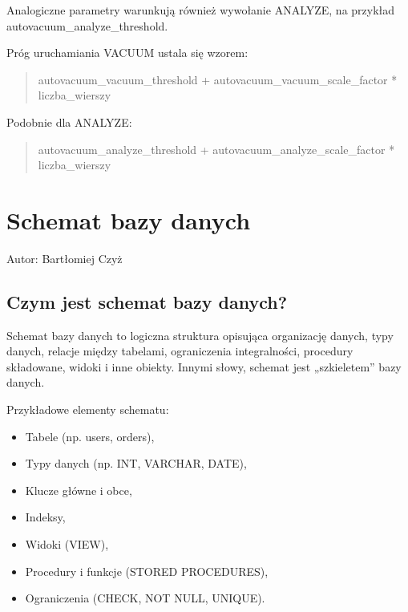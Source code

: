 \documentclass[a4paper,11pt,polish]{sphinxmanual}
\begin{document}
\sphinxAtStartPar
Analogiczne parametry warunkują również wywołanie ANALYZE, na przykład autovacuum\_analyze\_threshold.

\sphinxAtStartPar
Próg uruchamiania VACUUM ustala się wzorem:
\begin{quote}

\sphinxAtStartPar
autovacuum\_vacuum\_threshold + autovacuum\_vacuum\_scale\_factor * liczba\_wierszy
\end{quote}

\sphinxAtStartPar
Podobnie dla ANALYZE:
\begin{quote}

\sphinxAtStartPar
autovacuum\_analyze\_threshold + autovacuum\_analyze\_scale\_factor * liczba\_wierszy
\end{quote}


\section{Schemat bazy danych}
\label{\detokenize{Kontrola_i_konserwacja/kontrola_i_konserwacja:schemat-bazy-danych}}
\sphinxAtStartPar
Autor: Bartłomiej Czyż


\subsection{Czym jest schemat bazy danych?}
\label{\detokenize{Kontrola_i_konserwacja/kontrola_i_konserwacja:czym-jest-schemat-bazy-danych}}
\sphinxAtStartPar
Schemat bazy danych to logiczna struktura opisująca organizację danych, typy danych, relacje między tabelami, ograniczenia integralności, procedury składowane, widoki i inne obiekty. Innymi słowy, schemat jest „szkieletem” bazy danych.

\sphinxAtStartPar
Przykładowe elementy schematu:
\begin{itemize}
\item {} 
\sphinxAtStartPar
Tabele (np. users, orders),

\item {} 
\sphinxAtStartPar
Typy danych (np. INT, VARCHAR, DATE),

\item {} 
\sphinxAtStartPar
Klucze główne i obce,

\item {} 
\sphinxAtStartPar
Indeksy,

\item {} 
\sphinxAtStartPar
Widoki (VIEW),

\item {} 
\sphinxAtStartPar
Procedury i funkcje (STORED PROCEDURES),

\item {} 
\sphinxAtStartPar
Ograniczenia (CHECK, NOT NULL, UNIQUE).

\end{itemize}
\end{document}
